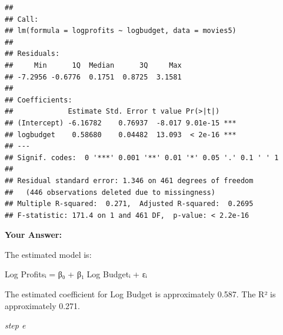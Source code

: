 \documentclass[
]{article}
\newenvironment{Shaded}{\begin{snugshade}}{\end{snugshade}}
\newcommand{\AttributeTok}[1]{\textcolor[rgb]{0.13,0.29,0.53}{#1}}
\newcommand{\ConstantTok}[1]{\textcolor[rgb]{0.56,0.35,0.01}{#1}}
\newcommand{\DecValTok}[1]{\textcolor[rgb]{0.00,0.00,0.81}{#1}}
\newcommand{\FunctionTok}[1]{\textcolor[rgb]{0.13,0.29,0.53}{\textbf{#1}}}
\newcommand{\NormalTok}[1]{#1}
\newcommand{\OtherTok}[1]{\textcolor[rgb]{0.56,0.35,0.01}{#1}}
\newcommand{\SpecialCharTok}[1]{\textcolor[rgb]{0.81,0.36,0.00}{\textbf{#1}}}
\begin{document}
\begin{Shaded}
\end{Shaded}

\begin{verbatim}
## 
## Call:
## lm(formula = logprofits ~ logbudget, data = movies5)
## 
## Residuals:
##     Min      1Q  Median      3Q     Max 
## -7.2956 -0.6776  0.1751  0.8725  3.1581 
## 
## Coefficients:
##             Estimate Std. Error t value Pr(>|t|)    
## (Intercept) -6.16782    0.76937  -8.017 9.01e-15 ***
## logbudget    0.58680    0.04482  13.093  < 2e-16 ***
## ---
## Signif. codes:  0 '***' 0.001 '**' 0.01 '*' 0.05 '.' 0.1 ' ' 1
## 
## Residual standard error: 1.346 on 461 degrees of freedom
##   (446 observations deleted due to missingness)
## Multiple R-squared:  0.271,  Adjusted R-squared:  0.2695 
## F-statistic: 171.4 on 1 and 461 DF,  p-value: < 2.2e-16
\end{verbatim}

\textbf{Your Answer:}

The estimated model is:

Log Profitsᵢ = β₀ + β₁ Log Budgetᵢ + εᵢ

The estimated coefficient for Log Budget is approximately 0.587. The R²
is approximately 0.271.

\emph{step e}
\end{document}
